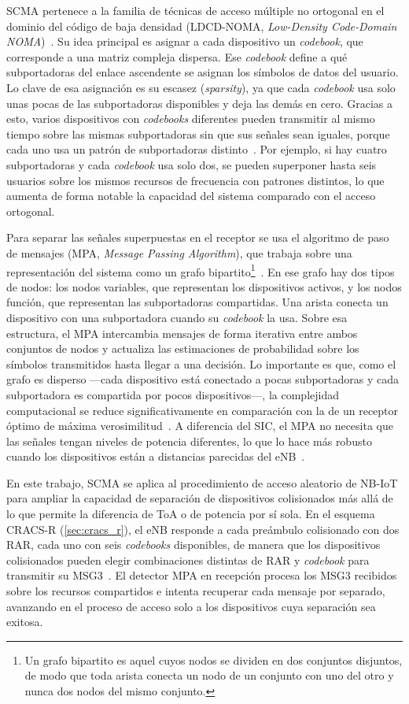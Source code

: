 SCMA pertenece a la familia de técnicas de acceso múltiple no ortogonal en el dominio del
código de baja densidad (LDCD-NOMA,
\textit{Low-Density Code-Domain NOMA})~\cite{ref9, ref10}. Su idea principal es asignar a
cada dispositivo un \textit{codebook}, que corresponde a una matriz compleja dispersa. Ese
\textit{codebook} define a qué subportadoras del enlace ascendente se asignan los símbolos de
datos del usuario. Lo clave de esa asignación es su escasez (\textit{sparsity}), ya que cada
\textit{codebook} usa solo unas pocas de las subportadoras disponibles y deja las demás en
cero. Gracias a esto, varios dispositivos con \textit{codebooks} diferentes pueden transmitir
al mismo tiempo sobre las mismas subportadoras sin que sus señales sean iguales, porque cada
uno usa un patrón de subportadoras distinto~\cite{ref9, ref10}. Por ejemplo, si hay cuatro
subportadoras y cada \textit{codebook} usa solo dos, se pueden superponer hasta seis usuarios
sobre los mismos recursos de frecuencia con patrones distintos, lo que aumenta de forma
notable la capacidad del sistema comparado con el acceso ortogonal.

Para separar las señales superpuestas en el receptor se usa el algoritmo de paso de
mensajes (MPA, \textit{Message Passing Algorithm}), que trabaja sobre una representación
del sistema como un grafo bipartito\footnote{Un grafo bipartito es aquel cuyos nodos se
dividen en dos conjuntos disjuntos, de modo que toda arista conecta un nodo de un conjunto
con uno del otro y nunca dos nodos del mismo conjunto.}~\cite{ref9, ref10}. En ese grafo
hay dos tipos de nodos: los nodos variables, que representan los dispositivos activos, y los
nodos función, que representan las subportadoras compartidas. Una arista conecta un
dispositivo con una subportadora cuando su \textit{codebook} la usa. Sobre esa estructura,
el MPA intercambia mensajes de forma iterativa entre ambos conjuntos de nodos y actualiza
las estimaciones de probabilidad sobre los símbolos transmitidos hasta llegar a una decisión.
Lo importante es que, como el grafo es disperso ---cada dispositivo está conectado a pocas
subportadoras y cada subportadora es compartida por pocos dispositivos---, la complejidad
computacional se reduce significativamente en comparación con la de un receptor óptimo de
máxima verosimilitud~\cite{ref10}. A diferencia del SIC, el MPA no necesita que las señales tengan
niveles de potencia diferentes, lo que lo hace más robusto cuando los dispositivos están a
distancias parecidas del eNB~\cite{ref9}.

En este trabajo, SCMA se aplica al procedimiento de acceso aleatorio de NB-IoT para ampliar
la capacidad de separación de dispositivos colisionados más allá de lo que permite la
diferencia de ToA o de potencia por sí sola. En el esquema CRACS-R
(\cref{sec:cracs_r}), el eNB responde a cada preámbulo colisionado
con dos RAR, cada uno con seis \textit{codebooks} disponibles, de manera que los dispositivos
colisionados pueden elegir combinaciones distintas de RAR y \textit{codebook} para transmitir
su MSG3~\cite{ref9}. El detector MPA en recepción procesa los MSG3 recibidos sobre los
recursos compartidos e intenta recuperar cada mensaje por separado, avanzando en el proceso
de acceso solo a los dispositivos cuya separación sea exitosa.

